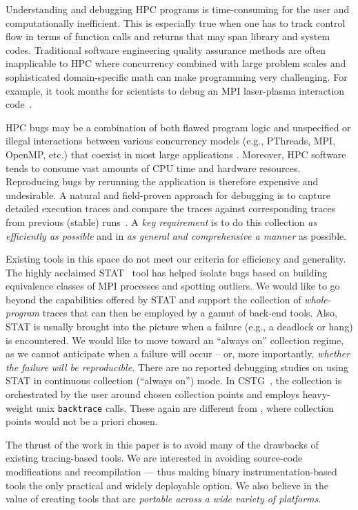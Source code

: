Understanding and debugging HPC programs 
is time-consuming for the user and computationally inefficient.
%
This is especially true when one has to 
track control flow in terms of function calls and returns that may
span library and system codes. 
%
Traditional software engineering quality assurance methods are 
often inapplicable to HPC where concurrency combined with 
large problem scales and sophisticated domain-specific math can make programming 
very challenging. 
%
For example, it took months for scientists to debug an MPI laser-plasma interaction 
code~\cite{hpcdoe}.


HPC bugs may be a combination of both flawed program logic and unspecified or illegal interactions between various concurrency models (e.g., PThreads, MPI, OpenMP, etc.) that coexist in most large applications \cite{hpcdoe}. Moreover, HPC software tends to consume vast amounts of CPU time and hardware resources. Reproducing bugs by rerunning the application is therefore expensive and undesirable. 
A natural and field-proven approach for debugging is to capture detailed execution traces and compare the traces against corresponding traces from previous (stable) runs~\cite{stat,cstg}.
%
A {\em key requirement} is to do this collection {\em as efficiently as possible}
and in {\em as general and comprehensive a manner} as possible.


Existing tools in this space
do not meet our criteria for efficiency and generality.
%
The highly acclaimed STAT~\cite{stat} tool has helped isolate
bugs based on building equivalence classes of MPI processes and spotting
outliers.
%
We would like to go beyond the capabilities offered by STAT and support
the collection of {\em whole-program} traces that can then be employed
by a  gamut of back-end tools.
%
Also, STAT is usually brought into the picture
when a failure (e.g., a deadlock or hang) is encountered. We would like
to move toward an ``always on'' collection regime, as we cannot anticipate
when a failure will occur -- or, more importantly, {\em whether the failure
will be reproducible.}
%
There are no reported debugging studies on using STAT in
continuous collection (``always on'') mode.
%
In CSTG~\cite{cstg}, the collection is orchestrated by the
user around chosen collection points and employs heavy-weight
unix {\tt backtrace} calls.
%
These again are different from \parlot, where collection points would not be a priori chosen.


The thrust of the work in this paper is to avoid many of the drawbacks of existing
tracing-based tools.
%
We are interested in avoiding
source-code modifications and recompilation --- thus making binary
instrumentation-based tools the only practical and widely deployable option.
%
We also believe in the value
of creating tools that are {\em portable across a 
wide variety of platforms}.
%

